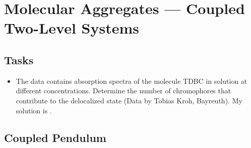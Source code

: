 \renewcommand{\lastmod}{May 3, 2024}
\renewcommand{\chapterauthors}{Markus Lippitz}


\chapter{Molecular Aggregates --- Coupled Two-Level Systems}
\label{chap:molecular_aggregates}


\section{Tasks}

\begin{itemize}
\item The data contains absorption spectra of the molecule TDBC in solution at different concentrations. Determine the number of chromophores that contribute to the delocalized state (Data by Tobias Kroh, Bayreuth).  My solution is .

\end{itemize}






\section{Coupled Pendulum}

